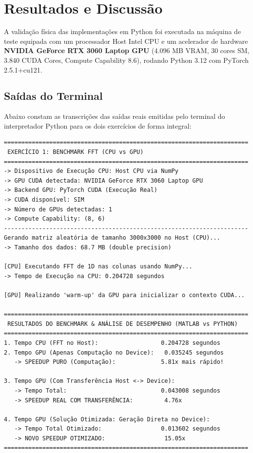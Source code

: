 \documentclass[12pt,a4paper]{article}
\begin{document}
\section{Resultados e Discussão}

A validação física das implementações em Python foi executada na máquina de teste equipada com um processador Host Intel CPU e um acelerador de hardware \textbf{NVIDIA GeForce RTX 3060 Laptop GPU} (4.096 MB VRAM, 30 cores SM, 3.840 CUDA Cores, Compute Capability 8.6), rodando Python 3.12 com PyTorch 2.5.1+cu121.

\subsection{Saídas do Terminal}
Abaixo constam as transcrições das saídas reais emitidas pelo terminal do interpretador Python para os dois exercícios de forma integral:

\begin{lstlisting}[basicstyle=\ttfamily\scriptsize, breaklines=true, numbers=none]
======================================================================
 EXERCÍCIO 1: BENCHMARK FFT (CPU vs GPU)
======================================================================
-> Dispositivo de Execução CPU: Host CPU via NumPy
-> GPU CUDA detectada: NVIDIA GeForce RTX 3060 Laptop GPU
-> Backend GPU: PyTorch CUDA (Execução Real)
-> CUDA disponível: SIM
-> Número de GPUs detectadas: 1
-> Compute Capability: (8, 6)
----------------------------------------------------------------------
Gerando matriz aleatória de tamanho 3000x3000 no Host (CPU)...
-> Tamanho dos dados: 68.7 MB (double precision)

[CPU] Executando FFT de 1D nas colunas usando NumPy...
-> Tempo de Execução na CPU: 0.204728 segundos

[GPU] Realizando 'warm-up' da GPU para inicializar o contexto CUDA...

======================================================================
 RESULTADOS DO BENCHMARK & ANÁLISE DE DESEMPENHO (MATLAB vs PYTHON)
======================================================================
1. Tempo CPU (FFT no Host):                  0.204728 segundos
2. Tempo GPU (Apenas Computação no Device):   0.035245 segundos
   -> SPEEDUP PURO (Computação):             5.81x mais rápido!

3. Tempo GPU (Com Transferência Host <-> Device):
   -> Tempo Total:                           0.043008 segundos
   -> SPEEDUP REAL COM TRANSFERÊNCIA:         4.76x

4. Tempo GPU (Solução Otimizada: Geração Direta no Device):
   -> Tempo Total Otimizado:                 0.013602 segundos
   -> NOVO SPEEDUP OTIMIZADO:                 15.05x
======================================================================
\end{lstlisting}
\end{document}
